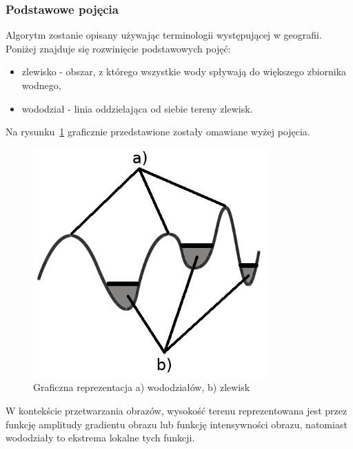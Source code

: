 \subsubsection{Podstawowe pojęcia}
Algorytm zostanie opisany używając terminologii występującej w geografii. Poniżej znajduje się rozwinięcie podstawowych pojęć:
\begin{itemize}
  \item zlewisko - obszar, z którego wszystkie wody spływają do większego zbiornika wodnego,
  \item wododział - linia oddzielająca od siebie tereny zlewisk.
\end{itemize}
Na rysunku~\ref{fig:watershed_graphic} graficznie przedstawione zostały omawiane wyżej pojęcia.
\begin{figure}
  \centering
  \includegraphics[width=9cm]{img/watershed-graphic}
  \caption{Graficzna reprezentacja a) wododziałów, b) zlewisk }
  \label{fig:watershed_graphic}
\end{figure}
W kontekście przetwarzania obrazów, wysokość terenu reprezentowana jest przez funkcję amplitudy gradientu obrazu lub funkcję intensywności obrazu, natomiast wododziały to ekstrema lokalne tych funkcji.
